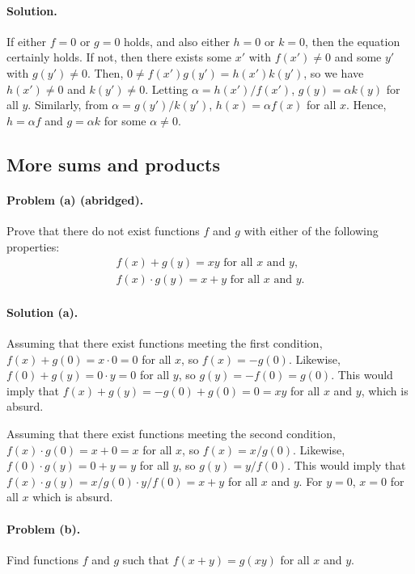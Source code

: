 \documentclass{article}
\begin{document}
\paragraph{Solution.} If either $f = 0$ or $g = 0$ holds, and also either
$h = 0$ or $k = 0$, then the equation certainly holds. If not, then there
exists some $x'$ with $f(x') \neq 0$ and some $y'$ with $g(y') \neq 0$. Then,
$0 \neq f(x')g(y') = h(x')k(y')$, so we have $h(x') \neq 0$ and $k(y') \neq 0$.
Letting $\alpha = h(x')/f(x')$, $g(y) = \alpha k(y)$ for all $y$. Similarly,
from $\alpha = g(y')/k(y')$, $h(x) = \alpha f(x)$ for all $x$. Hence, $h =
\alpha f$ and $g = \alpha k$ for some $\alpha \neq 0$.

\setcounter{subsection}{18}
\subsection{More sums and products}

\paragraph{Problem (a) (abridged).} Prove that there do not exist functions $f$
and $g$ with either of the following properties: \begin{align*}
  f(x) + g(y) = xy \text{ for all } x \text{ and } y, \\
  f(x) \cdot g(y) = x + y \text{ for all } x \text{ and } y.
\end{align*}

\paragraph{Solution (a).} Assuming that there exist functions meeting the first
condition, $f(x) + g(0) = x \cdot 0 = 0$ for all $x$, so $f(x) = -g(0)$.
Likewise, $f(0) + g(y) = 0 \cdot y = 0$ for all $y$, so $g(y) = -f(0) = g(0)$.
This would imply that $f(x) + g(y) = -g(0) + g(0) = 0 = xy$ for all $x$ and
$y$, which is absurd.

Assuming that there exist functions meeting the second condition, $f(x) \cdot
g(0) = x + 0 = x$ for all $x$, so $f(x) = x/g(0)$. Likewise, $f(0) \cdot g(y) =
0 + y = y$ for all $y$, so $g(y) = y/f(0)$. This would imply that $f(x) \cdot
g(y) = x/g(0) \cdot y/f(0) = x + y$ for all $x$ and $y$. For $y = 0$, $x = 0$
for all $x$ which is absurd.

\paragraph{Problem (b).} Find functions $f$ and $g$ such that $f(x + y) =
g(xy)$ for all $x$ and $y$.
\end{document}

